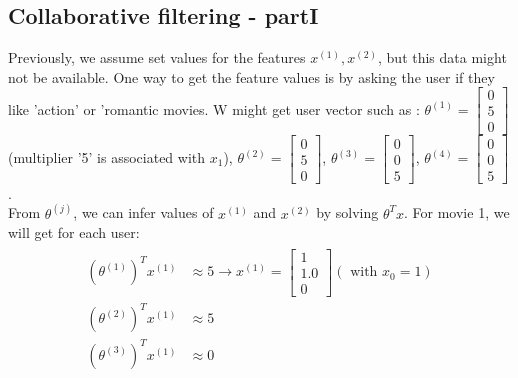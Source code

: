 \documentclass[a4paper,12pt]{report}
\begin{document}
\subsection{Collaborative filtering - partI}
Previously, we assume set values for the features $x^{(1)}, x^{(2)}$, but this data might not be available. One way to get the feature values is by asking the user if they like 'action' or 'romantic movies. W might get user vector such as : $\theta^{(1)} = \left[ \begin{smallmatrix} 0\\5\\0\end{smallmatrix} \right]$ (multiplier '5' is associated with $x_1$),  $\theta^{(2)} = \left[ \begin{smallmatrix} 0\\5\\0\end{smallmatrix} \right]$,  $\theta^{(3)} = \left[ \begin{smallmatrix} 0\\0\\5\end{smallmatrix} \right]$,  $\theta^{(4)} = \left[ \begin{smallmatrix} 0\\0\\5\end{smallmatrix} \right]$. \\
From $\theta^{(j)}$, we can infer values of $x^{(1)}$ and $x^{(2)}$ by solving $\theta^T x$. For movie 1, we will get for each user:
\begin{align}
\begin{split}
(\theta^{(1)})^T x^{(1)} & \approx 5 \rightarrow x^{(1)} = \left[ \begin{smallmatrix} 1\\1.0\\0\end{smallmatrix}\right] (\text{\ with \ }x_0=1)\\ 
(\theta^{(2)})^T x^{(1)} & \approx 5 \\
(\theta^{(3)})^T x^{(1)} & \approx 0 \\
\end{split}
\end{align}
\end{document}
